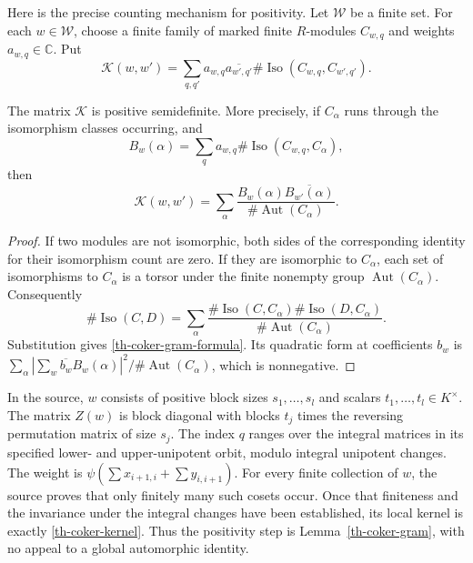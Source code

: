 Here is the precise counting mechanism for positivity.  Let $\mathcal W$
be a finite set.  For each $w\in\mathcal W$, choose a finite family
of marked finite $R$-modules $C_{w,q}$ and weights $a_{w,q}\in\mathbb C$.
Put
\begin{equation}\label{th-coker-kernel}
 \mathcal K(w,w')=
  \sum_{q,q'}a_{w,q}\overline{a_{w',q'}}
       \#\operatorname{Iso}(C_{w,q},C_{w',q'}).
\end{equation}
\begin{lemma}\label{th-coker-gram}
The matrix $\mathcal K$ is positive semidefinite.  More precisely, if
$C_\alpha$ runs through the isomorphism classes occurring, and
\[
 B_w(\alpha)=\sum_q a_{w,q}
                  \#\operatorname{Iso}(C_{w,q},C_\alpha),
\]
then
\begin{equation}\label{th-coker-gram-formula}
 \mathcal K(w,w')=
 \sum_\alpha
 \frac{B_w(\alpha)\overline{B_{w'}(\alpha)}}
      {\#\operatorname{Aut}(C_\alpha)}.
\end{equation}
\end{lemma}

\begin{proof}
If two modules are not isomorphic, both sides of the corresponding
identity for their isomorphism count are zero.  If they are isomorphic
to $C_\alpha$, each set of isomorphisms to $C_\alpha$ is a torsor
under the finite nonempty group $\operatorname{Aut}(C_\alpha)$.
Consequently
\[
 \#\operatorname{Iso}(C,D)=
 \sum_\alpha
 \frac{\#\operatorname{Iso}(C,C_\alpha)
       \#\operatorname{Iso}(D,C_\alpha)}
      {\#\operatorname{Aut}(C_\alpha)}.
\]
Substitution gives \eqref{th-coker-gram-formula}.  Its quadratic form
at coefficients $b_w$ is
$\sum_\alpha|\sum_w \overline{b_w} B_w(\alpha)|^2/
\#\operatorname{Aut}(C_\alpha)$, which is nonnegative.
\end{proof}

In the source, $w$ consists of positive block sizes $s_1,\ldots,s_l$
and scalars $t_1,\ldots,t_l\in K^\times$.  The matrix $Z(w)$ is block
diagonal with blocks $t_j$ times the reversing permutation matrix of
size $s_j$.  The index $q$ ranges over the integral matrices in its
specified lower- and upper-unipotent orbit, modulo integral
unipotent changes.  The weight is
$\psi(\sum x_{i+1,i}+\sum y_{i,i+1})$.
For every finite collection of $w$, the source proves that only
finitely many such cosets occur.  Once that finiteness and the
invariance under the integral changes have been established, its
local kernel is exactly \eqref{th-coker-kernel}.  Thus the positivity
step is Lemma~\ref{th-coker-gram}, with no appeal to a global
automorphic identity.

